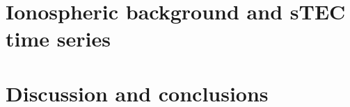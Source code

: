 \documentclass[times,twocolumn,final,authoryear]{elsarticle}
\begin{document}
\section{Ionospheric background and sTEC time series}
\label{sec:sTEC-time_series}
     
     
     
     
     
\section{Discussion and conclusions}
\label{sec:discussion}



   
\end{document}

